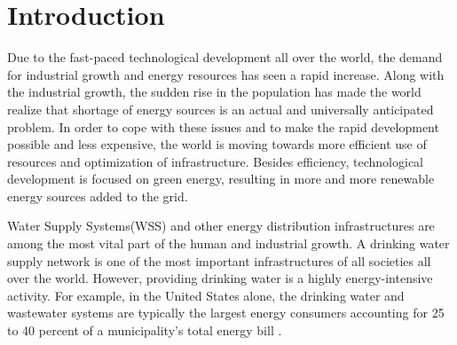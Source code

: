 \chapter{Introduction}
\label{introduction}

Due to the fast-paced technological development all over the world, the demand for industrial growth and energy resources has seen a rapid increase. Along with the industrial growth, the sudden rise in the population has made the world realize that shortage of energy sources is an actual and universally anticipated problem. In order to cope with these issues and to make the rapid development possible and less expensive, the world is moving towards more efficient use of resources and optimization of infrastructure. Besides efficiency, technological development is focused on green energy, resulting in more and more renewable energy sources added to the grid. 

Water Supply Systems(WSS) and other energy distribution infrastructures are among the most vital part of the human and industrial growth. A drinking water supply network is one of the most important infrastructures of all societies all over the world. However, providing drinking water is a highly energy-intensive activity. For example, in the United States alone, the drinking water and wastewater systems are typically the largest energy consumers accounting for 25 to 40 percent of a municipality's total energy bill \cite{fluctuating_price}.





